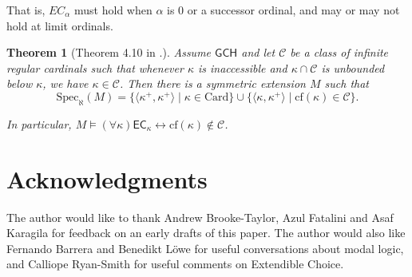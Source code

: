 \documentclass[a4paper,11pt]{amsart}
\newtheorem{theorem}{Theorem}[section]
\theoremstyle{definition}
\newcommand{\GCH}{\mathsf{GCH}}
\newcommand{\EC}{\mathsf{EC}}
\begin{document}
 That is, $EC_\alpha$ must hold when $\alpha$ is $0$ or a successor ordinal, and may or may not hold at limit ordinals. 

\begin{theorem} [Theorem 4.10 in \cite{RS25eccentricity}.]\label{extendible:theorem}
     Assume $\GCH$ and let $\mathcal{C}$ be a class of infinite regular cardinals such that whenever $\kappa$ is inaccessible and $\kappa \cap \mathcal{C}$ is unbounded below $\kappa$, we have $\kappa \in \mathcal{C}$. Then there is a symmetric extension $M$ such that \[\text{Spec}_\aleph(M) = \{ \langle \kappa^+, \kappa^+ \rangle \mid \kappa \in \text{Card} \} \cup \{\langle \kappa, \kappa^+ \rangle \mid \text{cf}(\kappa) \in \mathcal{C} \}.\]

     In particular, $M \models (\forall \kappa) \EC_\kappa \leftrightarrow \text{cf}(\kappa) \notin \mathcal{C}$.
 \end{theorem}

\section*{Acknowledgments}

The author would like to thank Andrew Brooke-Taylor, Azul Fatalini and Asaf Karagila for feedback on an early drafts of this paper. The author would also like Fernando Barrera and Benedikt Löwe for useful conversations about modal logic, and Calliope Ryan-Smith for useful comments on Extendible Choice. 




\end{document}
